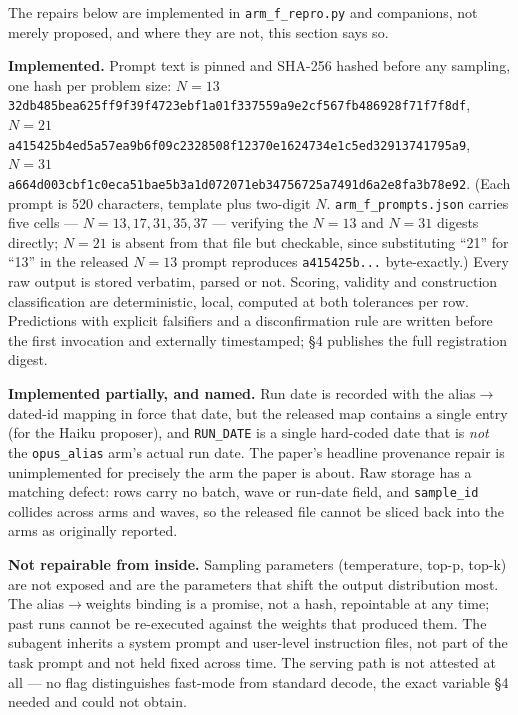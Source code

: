 The repairs below are implemented in \texttt{arm\_f\_repro.py} and companions, not merely proposed, and where they are not, this section says so.

\textbf{Implemented.} Prompt text is pinned and SHA-256 hashed before any sampling, one hash per problem size: $N = 13$ \texttt{32db485b\bk ea625ff9\bk f39f4723\bk ebf1a01f\bk 337559a9\bk e2cf567f\bk b486928f\bk 71f7f8df}, $N = 21$ \texttt{a415425b\bk 4ed5a57e\bk a9b6f09c\bk 2328508f\bk 12370e16\bk 24734e1c\bk 5ed32913\bk 741795a9}, $N = 31$ \texttt{a664d003\bk cbf1c0ec\bk a51bae5b\bk 3a1d0720\bk 71eb3475\bk 6725a749\bk 1d6a2e8f\bk a3b78e92}. (Each prompt is 520 characters, template plus two-digit $N$. \texttt{arm\_f\_prompts.json} carries five cells --- $N = 13, 17, 31, 35, 37$ --- verifying the $N = 13$ and $N = 31$ digests directly; $N = 21$ is absent from that file but checkable, since substituting ``21'' for ``13'' in the released $N = 13$ prompt reproduces \texttt{a415425b...} byte-exactly.) Every raw output is stored verbatim, parsed or not. Scoring, validity and construction classification are deterministic, local, computed at both tolerances per row. Predictions with explicit falsifiers and a disconfirmation rule are written before the first invocation and externally timestamped; \S4 publishes the full registration digest.

\textbf{Implemented partially, and named.} Run date is recorded with the alias$\to$dated-id mapping in force that date, but the released map contains a single entry (for the Haiku proposer), and \texttt{RUN\_DATE} is a single hard-coded date that is \emph{not} the \texttt{opus\_alias} arm's actual run date. The paper's headline provenance repair is unimplemented for precisely the arm the paper is about. Raw storage has a matching defect: rows carry no batch, wave or run-date field, and \texttt{sample\_id} collides across arms and waves, so the released file cannot be sliced back into the arms as originally reported.

\textbf{Not repairable from inside.} Sampling parameters (temperature, top-p, top-k) are not exposed and are the parameters that shift the output distribution most. The alias$\to$weights binding is a promise, not a hash, repointable at any time; past runs cannot be re-executed against the weights that produced them. The subagent inherits a system prompt and user-level instruction files, not part of the task prompt and not held fixed across time. The serving path is not attested at all --- no flag distinguishes fast-mode from standard decode, the exact variable \S4 needed and could not obtain.

